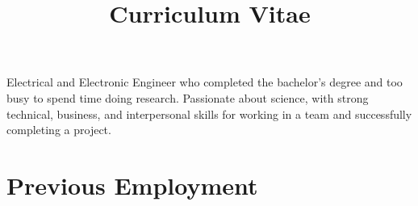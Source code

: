 \documentclass[11pt,a4paper,sans]{moderncv}        %
\title{Curriculum Vitae}                               %
\begin{document}
\makecvtitle

\small{Electrical and Electronic Engineer who completed the bachelor's degree and too busy to spend time doing research. Passionate about science, with strong technical, business, and interpersonal skills for working in a team and successfully completing a project.}

\section{Previous Employment}

\vspace{6pt}
\end{document}
